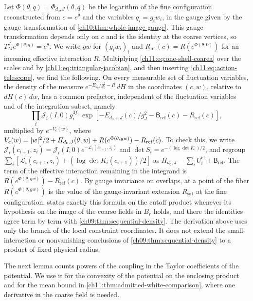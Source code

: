 Let $\Phi(\theta,q)=\Phi_{d_0,J}(\theta,q)$ be the logarithm of the fine configuration reconstructed from $c=e^\theta$ and the variables $q_i=g_iw_i$, in the gauge given by the gauge transformation of \cref{ch10:thm:whole-image-gauge}. This gauge transformation depends only on $c$ and is the identity at the coarse vertices, so $T_M^Je^{\Phi(\theta,q)}=e^\theta$. We write $gw$ for $(g_iw_i)_i$ and $R_{\mathrm{ref}}(c)=R(e^{\Phi(\theta,0)})$ for an incoming effective interaction $R$. Multiplying \eqref{ch11:eq:one-shell-coarea} over the scales and by \eqref{ch11:eq:triangular-jacobian}, and then inserting \eqref{ch11:eq:action-telescope}, we find the following. On every measurable set of fluctuation variables, the density of the measure $e^{-E_{d_0}/g_0^2-R}\,dH$ in the coordinates $(c,w)$, relative to $dH(c)\,dw$, has a common prefactor, independent of the fluctuation variables and of the integration subset, namely
\begin{equation}\label{ch11:eq:common-prefactor}
 \prod_i\mathcal J_i(I,0)g_i^{3f_i}\,
 \exp[-E_{d_0+J}(c)/g_J^2-\mathsf B_{\mathrm{ref}}(c)-R_{\mathrm{ref}}(c)],
\end{equation}
multiplied by $e^{-V_c(w)}$, where $V_c(w)=\lvert w\rvert^2/2+H_{d_0,J}(\theta,w)+R(e^{\Phi(\theta,gw)})-R_{\mathrm{ref}}(c)$. To check this, we write $\mathcal J_i(c_{i+1},z_i)=\mathcal J_i(I,0)e^{-\mathcal L_i(c_{i+1},z_i)}$ and $\det S_i=e^{-(\log\det K_i)/2}$, and regroup $\sum_i[\mathcal L_i(c_{i+1},z_i)+(\log\det K_i(c_{i+1}))/2]$ as $H_{d_0,J}-\sum_iU_i^{\mathrm{cl}}+\mathsf B_{\mathrm{ref}}$. The term of the effective interaction remaining in the integrand is $R(e^{\Phi(\theta,gw)})-R_{\mathrm{ref}}(c)$. By gauge invariance on overlaps, at a point of the fiber $R(e^{\Phi(\theta,gw)})$ is the value of the gauge-invariant extension $R_{\mathrm{sat}}$ at the fine configuration.  states exactly this formula on the cutoff product whenever its hypothesis on the image of the coarse fields in $B_r$ holds, and there the identities agree term by term with \cref{ch09:thm:sequential-density}. The derivation above uses only the branch of the local constraint coordinates. It does not extend the small-interaction or nonvanishing conclusions of \cref{ch09:thm:sequential-density} to a product of fixed physical radius.

The next lemma counts powers of the coupling in the Taylor coefficients of the potential. We use it for the convexity of the potential on the enclosing product and for the mean bound in \cref{ch11:thm:admitted-white-comparison}, where one derivative in the coarse field is needed.

